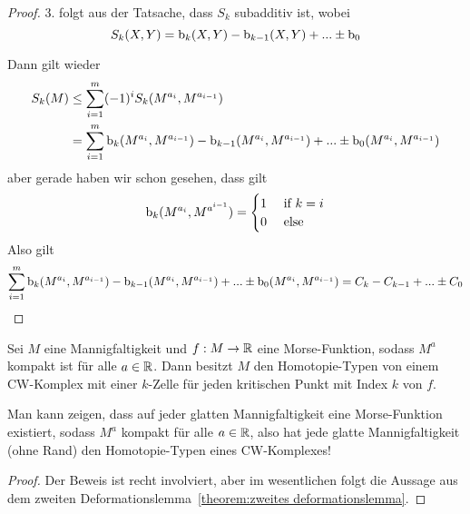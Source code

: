 \begin{proof}
    3. folgt aus der Tatsache, dass $S_k$ subadditiv ist, wobei 
    \[ 
      S_k(X, Y) 
      = { \operatorname{b} }_k(X, Y) - { \operatorname{b} }_{k - 1}(X, Y) + ... \pm { \operatorname{b} }_{0} 
    \]

    Dann gilt wieder
    \begin{align*} 
        S_k (M) 
            & \leq \sum_{i = 1}^m (-1)^i S_k(M^{a_i}, M^{a_{i-1}}) \\
            & = \sum_{i = 1}^m { \operatorname{b} }_k(M^{a_i}, M^{a_{i-1}}) 
            - { \operatorname{b} }_{k - 1}(M^{a_i}, M^{a_{i-1}})
            + ... \pm { \operatorname{b} }_0(M^{a_i}, M^{a_{i-1}})
    \end{align*}
    aber gerade haben wir schon gesehen, dass gilt
    \[ 
        { \operatorname{b} }_k(M^{a_i}, M^{a^{i-1}}) = 
            \begin{cases}
                1 & \text{ if } k = i \\
                0 & \text{ else }
            \end{cases}
    \]
    Also gilt
    \[ 
        \sum_{i = 1}^m { \operatorname{b} }_k(M^{a_i}, M^{a_{i-1}}) 
            - { \operatorname{b} }_{k - 1}(M^{a_i}, M^{a_{i-1}})
            + ... \pm { \operatorname{b} }_0(M^{a_i}, M^{a_{i-1}})
        = C_k - C_{k - 1} + ... \pm C_0
    \]

\end{proof}

\begin{theorem}
    \label{theorem:CW-komplex}
    Sei $M$ eine Mannigfaltigkeit und $f: M \to { \mathbb R }$ eine Morse-Funktion, sodass
    $M^a$ kompakt ist für alle $a \in { \mathbb R }$. 
    Dann besitzt $M$ den Homotopie-Typen von einem CW-Komplex mit einer $k$-Zelle 
    für jeden kritischen Punkt mit Index $k$ von $f$.
\end{theorem}

\begin{remark}
    Man kann zeigen, dass auf jeder glatten Mannigfaltigkeit eine Morse-Funktion
    existiert, sodass $M^a$ kompakt für alle $a \in { \mathbb R }$, also hat jede glatte 
    Mannigfaltigkeit (ohne Rand) den Homotopie-Typen eines CW-Komplexes!
\end{remark}

\begin{proof}
    Der Beweis ist recht involviert, aber im wesentlichen folgt die Aussage aus
    dem zweiten Deformationslemma~\ref{theorem:zweites deformationslemma}.
\end{proof}

